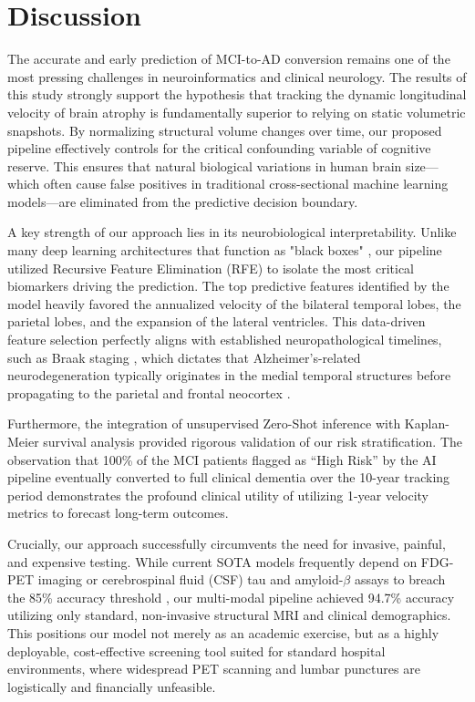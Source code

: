 \documentclass[11pt, a4paper]{article}
\begin{document}
\section{Discussion}
The accurate and early prediction of MCI-to-AD conversion remains one of the most pressing challenges in neuroinformatics and clinical neurology. The results of this study strongly support the hypothesis that tracking the dynamic longitudinal velocity of brain atrophy is fundamentally superior to relying on static volumetric snapshots. By normalizing structural volume changes over time, our proposed pipeline effectively controls for the critical confounding variable of cognitive reserve. This ensures that natural biological variations in human brain size---which often cause false positives in traditional cross-sectional machine learning models---are eliminated from the predictive decision boundary.

A key strength of our approach lies in its neurobiological interpretability. Unlike many deep learning architectures that function as "black boxes" \cite{basaia2019}, our pipeline utilized Recursive Feature Elimination (RFE) to isolate the most critical biomarkers driving the prediction. The top predictive features identified by the model heavily favored the annualized velocity of the bilateral temporal lobes, the parietal lobes, and the expansion of the lateral ventricles. This data-driven feature selection perfectly aligns with established neuropathological timelines, such as Braak staging \cite{braak1991}, which dictates that Alzheimer's-related neurodegeneration typically originates in the medial temporal structures before propagating to the parietal and frontal neocortex \cite{dickerson2009}. 

Furthermore, the integration of unsupervised Zero-Shot inference with Kaplan-Meier survival analysis provided rigorous validation of our risk stratification. The observation that 100\% of the MCI patients flagged as ``High Risk'' by the AI pipeline eventually converted to full clinical dementia over the 10-year tracking period demonstrates the profound clinical utility of utilizing 1-year velocity metrics to forecast long-term outcomes. 

Crucially, our approach successfully circumvents the need for invasive, painful, and expensive testing. While current SOTA models frequently depend on FDG-PET imaging or cerebrospinal fluid (CSF) tau and amyloid-$\beta$ assays to breach the 85\% accuracy threshold \cite{spasov2019}, our multi-modal pipeline achieved 94.7\% accuracy utilizing only standard, non-invasive structural MRI and clinical demographics. This positions our model not merely as an academic exercise, but as a highly deployable, cost-effective screening tool suited for standard hospital environments, where widespread PET scanning and lumbar punctures are logistically and financially unfeasible.
\end{document}
